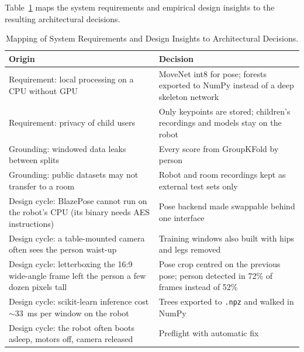 Table~\ref{tab:decisions} maps the system requirements and empirical design insights to the resulting architectural decisions.

\begin{table}[htbp]
  \centering
  \caption{Mapping of System Requirements and Design Insights to Architectural Decisions.}
  \label{tab:decisions}
  \begin{tabular}{|p{}|p{}|}
    \hline
    \rowcolor{gray!20}\textbf{Origin} & \textbf{Decision} \\
    \hline
    Requirement: local processing on a CPU without GPU & MoveNet int8 for pose; forests exported to NumPy instead of a deep skeleton network \\
    \hline
    Requirement: privacy of child users & Only keypoints are stored; children's recordings and models stay on the robot \\
    \hline
    Grounding: windowed data leaks between splits & Every score from GroupKFold by person \\
    \hline
    Grounding: public datasets may not transfer to a room & Robot and room recordings kept as external test sets only \\
    \hline
    Design cycle: BlazePose cannot run on the robot's CPU (its binary needs AES instructions) & Pose backend made swappable behind one interface \\
    \hline
    Design cycle: a table-mounted camera often sees the person waist-up & Training windows also built with hips and legs removed \\
    \hline
    Design cycle: letterboxing the 16:9 wide-angle frame left the person a few dozen pixels tall & Pose crop centred on the previous pose; person detected in 72\% of frames instead of 52\% \\
    \hline
    Design cycle: scikit-learn inference cost ${\sim}33$~ms per window on the robot & Trees exported to \texttt{.npz} and walked in NumPy \\
    \hline
    Design cycle: the robot often boots asleep, motors off, camera released & Preflight with automatic fix \\
    \hline
  \end{tabular}
\end{table}

